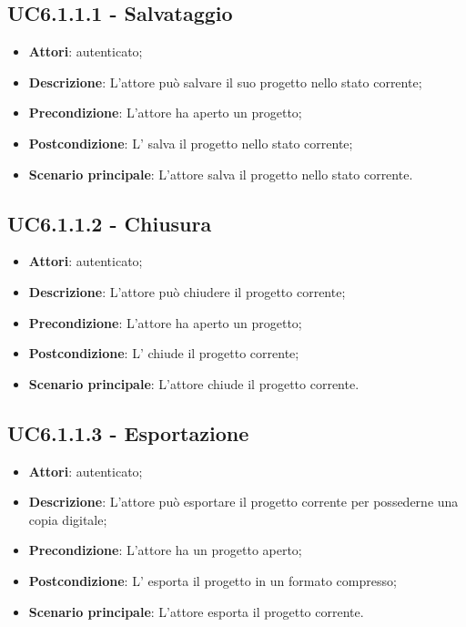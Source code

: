 \subsection{UC6.1.1.1 - Salvataggio}
\label{ssec:UC6.1.1.1}
\begin{itemize}
\item \textbf{Attori}:  autenticato;
\item \textbf{Descrizione}: L’attore può salvare il suo progetto nello stato corrente;
\item \textbf{Precondizione}: L’attore ha aperto un progetto;
\item \textbf{Postcondizione}: L’ salva il progetto nello stato corrente;
\item \textbf{Scenario principale}: L'attore salva il progetto nello stato corrente.
\end{itemize}
\subsection{UC6.1.1.2 - Chiusura}
\label{ssec:UC6.1.1.2}
\begin{itemize}
\item \textbf{Attori}:  autenticato;
\item \textbf{Descrizione}: L’attore può chiudere il progetto corrente;
\item \textbf{Precondizione}: L'attore ha aperto un progetto;
\item \textbf{Postcondizione}: L’ chiude il progetto corrente;
\item \textbf{Scenario principale}: L'attore chiude il progetto corrente.
\end{itemize}
\subsection{UC6.1.1.3 - Esportazione}
\label{ssec:UC6.1.1.3}
\begin{itemize}
\item \textbf{Attori}:  autenticato;
\item \textbf{Descrizione}: L’attore può esportare il progetto corrente per possederne una copia digitale;
\item \textbf{Precondizione}: L’attore ha un progetto aperto;
\item \textbf{Postcondizione}: L’ esporta il progetto in un formato compresso;
\item \textbf{Scenario principale}: L'attore esporta il progetto corrente.
\end{itemize}
